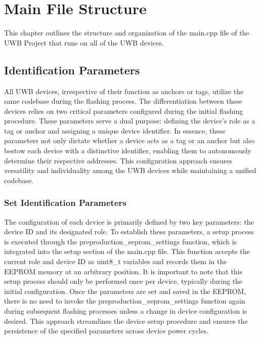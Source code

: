 \chapter{Main File Structure}
This chapter outlines the structure and organization of the main.cpp file of the UWB Project that runs on all of the UWB devices.

\section{Identification Parameters}
All UWB devices, irrespective of their function as anchors or tags, utilize the same codebase during the flashing process. 
The differentiation between these devices relies on two critical parameters configured during the initial flashing procedure. 
These parameters serve a dual purpose: defining the device's role as a tag or anchor and assigning a unique device identifier.
\vspace{4pt}
\newline
In essence, these parameters not only dictate whether a device acts as a tag or an anchor but also bestow each device with a distinctive identifier, enabling them to autonomously determine their respective addresses. 
This configuration approach ensures versatility and individuality among the UWB devices while maintaining a unified codebase.

\subsection{Set Identification Parameters}
The configuration of each device is primarily defined by two key parameters: the device ID and its designated role. 
To establish these parameters, a setup process is executed through the preproduction\_eeprom\_settings function, which is integrated into the setup section of the main.cpp file. 
This function accepts the current role and device ID as uint8\_t variables and records them in the EEPROM memory at an arbitrary position.
\vspace{4pt}
\newline
It is important to note that this setup process should only be performed once per device, typically during the initial configuration. 
Once the parameters are set and saved in the EEPROM, there is no need to invoke the preproduction\_eeprom\_settings function again during subsequent flashing processes unless a change in device configuration is desired. 
This approach streamlines the device setup procedure and ensures the persistence of the specified parameters across device power cycles.


